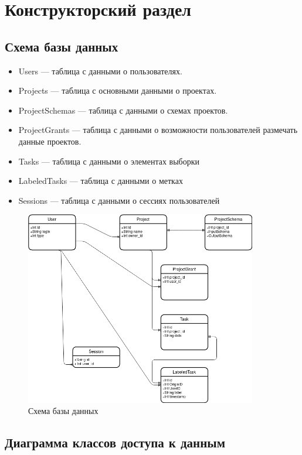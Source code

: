 \section{Конструкторский раздел}

\subsection{Схема базы данных}

\begin{itemize}
    \item Users --- таблица с данными о пользователях.
    \item Projects --- таблица с основными данными о проектах.
    \item ProjectSchemas --- таблица с данными о схемах проектов.
    \item ProjectGrants --- таблица с данными о возможности пользователей размечать данные проектов.
    \item Tasks --- таблица с данными о элементах выборки
    \item LabeledTasks --- таблица с данными о метках
    \item Sessions --- таблица с данными о сессиях пользователей
\end{itemize}

\begin{figure}[h!]
    \includegraphics[width=0.9\textwidth]{./dbschema.png}
    \caption{Схема базы данных}
\end{figure}

\subsection{Диаграмма классов доступа к данным}

